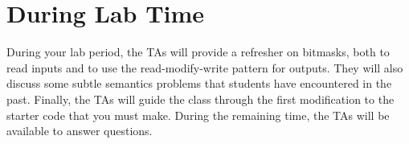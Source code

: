 \section*{During Lab Time}

During your lab period, the TAs will provide a refresher on bitmasks, both to
read inputs and to use the read-modify-write pattern for outputs. They will also
discuss some subtle semantics problems that students have encountered in the
past. Finally, the TAs will guide the class through the first modification to
the starter code that you must make. During the remaining time, the TAs will be
available to answer questions.